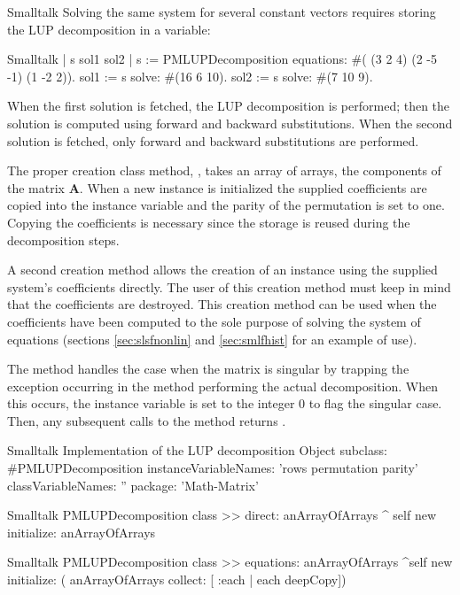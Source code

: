 \begin{displaycode}{Smalltalk}
Solving the same system for several constant vectors requires
storing the LUP decomposition in a variable:
\begin{displaycode}{Smalltalk}
 | s sol1 sol2 |
 s := PMLUPDecomposition equations: #( (3 2 4) (2 -5 -1) (1 -2 2)).
 sol1 := s solve: #(16 6 10).
 sol2 := s solve: #(7 10 9).
\end{displaycode}
When the first solution is fetched, the LUP decomposition is
performed; then the solution is computed using forward and
backward substitutions. When the second solution is fetched, only
forward and backward substitutions are performed.

The proper creation class method, , takes an array
of arrays, the components of the matrix $\textbf{A}$. When a new
instance is initialized the supplied coefficients are copied into
the instance variable  and the parity of the permutation
is set to one. Copying the coefficients is necessary since the
storage is reused during the decomposition steps. 

A second creation method  allows the creation of an
instance using the supplied system's coefficients directly. The
user of this creation method must keep in mind that the
coefficients are destroyed. This creation method can be used when
the coefficients have been computed to the sole purpose of solving
the system of equations (\cf sections \ref{sec:slsfnonlin} and
\ref{sec:smlfhist} for an example of use).

The method  handles the case when the
matrix is singular by trapping the exception occurring in the
method  performing the actual decomposition. When
this occurs, the instance variable  is set to the
integer 0 to flag the singular case. Then, any subsequent calls to
the method  returns .

\begin{listing}[label=lst:lup]{Smalltalk}
{Implementation of the LUP decomposition}
Object subclass: #PMLUPDecomposition
   instanceVariableNames: 'rows permutation parity'
   classVariableNames: ''
   package: 'Math-Matrix'
\end{listing}

\begin{displaycode}{Smalltalk}
PMLUPDecomposition class >> direct: anArrayOfArrays
    ^ self new initialize: anArrayOfArrays
\end{displaycode}

\begin{displaycode}{Smalltalk}
PMLUPDecomposition class >>  equations: anArrayOfArrays
        ^self new initialize: ( anArrayOfArrays collect: [ :each | 
                                                      each deepCopy])
\end{displaycode}


\end{displaycode}
